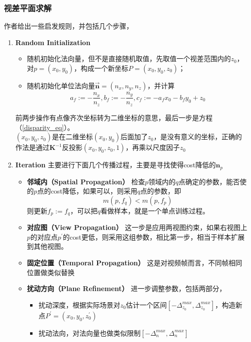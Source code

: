 \subsubsection*{视差平面求解}
	作者给出一些启发规则，并包括几个步骤，
	\begin{enumerate}
		\item \textbf{Random Initialization} 
			\begin{itemize}
				\item 随机初始化法向量，但不是直接随机取值，先取值一个视差范围内的$z_0$，对$p=(x_0,y_0)$，构成一个新坐标$P=(x_0,y_0,z_0)$；
				\item 随机初始化单位法向量$\overset{\rightarrow}{\mathbf{n}} = (n_x,n_y,n_z)$，并计算
				$$
					a_f := -\frac{n_x}{n_z}, b_f := -\frac{n_y}{n_z}, c_f := -a_fx_0-b_fy_0+z_0
				$$
			\end{itemize}
			前两步操作有点像齐次坐标转为二维坐标的意思，最后一步是方程（\ref{disparity_eq}）。\\

			$(x_0,y_0,z_0)$是在二维坐标$(x_0,y_0)$后面加了$z_0$，是没有意义的坐标，正确的作法是通过$\mathbf{K}^{-1}$反投影$(x_0,y_0,z_0,1)$，再乘以尺度因子$z_0$
		\item \textbf{Iteration} 主要进行下面几个传播过程，主要是寻找使得cost降低的$\mathbf{n}_p$
			\begin{itemize}
				\item \textbf{邻域内（Spatial Propagation）} 检查$p$领域内的$q$点确定的参数，能否使的$p$点的cost降低，如果可以，则采用$q$点的参数，即
				$$
					m(p,f_q) < m(p,f_p)
				$$
				则更新$f_p:=f_q$，可以把$q$看做样本，就是一个单点训练过程。

				\item \textbf{对应图（View Propagation）} 这一步是应用两视图约束，如果右视图上$p$的对应点$p^\prime$的cost更低，则采用这组参数，相比第一步，相当于样本扩展到其他视图。

				\item \textbf{固定位置（Temporal Propagation）} 这是对视频帧而言，不同帧相同位置做类似替换

				\item \textbf{扰动方向（Plane Refinement）} 进一步调整参数，包括两部分，
					\begin{itemize}
						\item 扰动深度，根据实际场景对$z_0$估计一个区间$[-\Delta_{z_0}^{max}, \Delta_{z_0}^{max}]$，构造新点$P^\prime=(x_0,y_0,z_0^\prime)$

						\item 扰动法向，对法向量也做类似限制$[-\Delta_{n}^{max}, \Delta_{n}^{max}]$


\end{itemize}
\end{itemize}
\end{enumerate}
